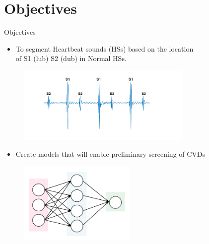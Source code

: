 \documentclass[10pt]{beamer}
\begin{document}

\section{Objectives}
\begin{frame}{Objectives}

	\begin{itemize}
	
		\item<1-> To segment Heartbeat sounds (HSs) based on the location \\of S1 (lub) S2 (dub) in Normal HSs.
	

	\end{itemize}
	{	\begin{figure}
			\centering
			\includegraphics[width=0.75\textwidth,height=0.25\textheight]{AAUgraphics/s1s2s1wc.png}
		\end{figure}
	}

   \pause
   
   \begin{itemize}
   	
   		\item<2-> Create models that will enable preliminary screening of CVDs	
   	
   \end{itemize}
   
   	{	\begin{figure}
   			\centering
   			\includegraphics[width=0.5\textwidth,height=0.35\textheight]{AAUgraphics/classification2.png}
   		\end{figure}
   	}


\end{frame}
\end{document}
